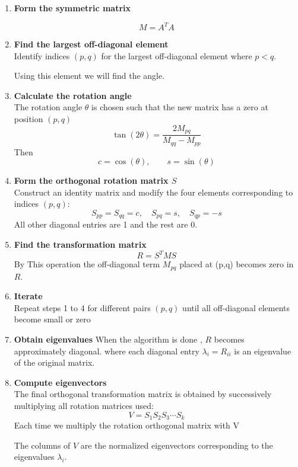 \documentclass[journal]{IEEEtran}
\begin{document}
\begin{enumerate}
\item \textbf{Form the symmetric matrix}

\[
M = A^T A
\] 
    \item \textbf{Find the largest off-diagonal element}  \\
    Identify indices \( (p, q) \) for the largest off-diagonal element where \( p < q \).
    
    Using this element we will find the angle.

    \item \textbf{Calculate the rotation angle}\\
    The rotation angle \( \theta \) is chosen such that the new matrix has
    a zero at position \( (p, q) \)
    \[
    \tan(2\theta) = \frac{2M_{pq}}{M_{qq} - M_{pp}}
    \]
    Then
    \[
    c = \cos(\theta), \qquad s = \sin(\theta)
    \]

    \item \textbf{Form the orthogonal rotation matrix \( S \)} \\ 
    Construct an identity matrix and modify the four elements
    corresponding to indices \( (p, q) \):
    \[
    S_{pp} = S_{qq} = c , \quad S_{pq} = s, \quad S_{qp} = -s
    \]
    All other diagonal entries are 1 and the rest are 0.

    \item \textbf{Find the transformation matrix} 
    \[
    R = S^T M S
    \]
    By This operation the off-diagonal term \( M_{pq} \) placed at (p,q) becomes zero in $R$.\\

    \item \textbf{Iterate}  \\
    Repeat steps 1 to 4 for different pairs \( (p, q) \) until all off-diagonal elements become small or zero 

    \item \textbf{Obtain eigenvalues}  
    When the algorithm is done , \( R \) becomes approximately diagonal.
    where each diagonal entry \( \lambda_i = R_{ii} \) is an eigenvalue of the original matrix.

    \item \textbf{Compute eigenvectors} \\ 
    The final orthogonal transformation matrix is obtained by
    successively multiplying all rotation matrices used:
    \[
    V = S_1 S_2 S_3 \cdots S_k
    \]
    Each time we multiply the rotation orthogonal matrix with V
   
    The columns of \( V \) are the normalized eigenvectors corresponding
    to the eigenvalues \( \lambda_i \).
\end{enumerate}
\end{document}
